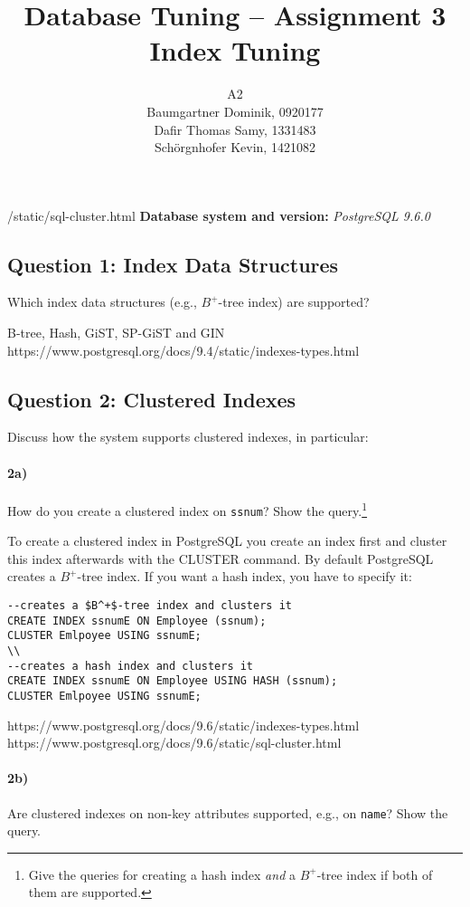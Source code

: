 \documentclass[11pt]{scrartcl}
\title{
  \textbf{\large Database Tuning -- Assignment 3}\\
  Index Tuning
}
\author{
 A2\\
\large Baumgartner Dominik, 0920177 \\
\large Dafir Thomas Samy, 1331483 \\
\large Sch\"orgnhofer Kevin, 1421082
}
\begin{document}
\maketitle

/static/sql-cluster.html
\noindent\textbf{Database system and version:} {\it PostgreSQL 9.6.0}

\subsection*{Question 1: Index Data Structures} Which index data structures (e.g., $B^+$-tree
index) are supported?

\smallskip

B-tree, Hash, GiST, SP-GiST and GIN\\
https://www.postgresql.org/docs/9.4/static/indexes-types.html

\subsection*{Question 2: Clustered Indexes} Discuss how the system
supports clustered indexes, in particular:

\paragraph{2a)} How do you create a clustered index on {\tt ssnum}?
Show the query.\footnote{Give the queries for creating a hash index
  \emph{and} a $B^+$-tree index if both of them are supported.}

\smallskip

To create a clustered index in PostgreSQL you create an index first and cluster this index afterwards with the CLUSTER command. By default PostgreSQL creates a $B^+$-tree index. If you want a hash index, you have to specify it:

{\small
\begin{verbatim}
--creates a $B^+$-tree index and clusters it
CREATE INDEX ssnumE ON Employee (ssnum);
CLUSTER Emlpoyee USING ssnumE;
\\
--creates a hash index and clusters it
CREATE INDEX ssnumE ON Employee USING HASH (ssnum);
CLUSTER Emlpoyee USING ssnumE;
\end{verbatim}
}

https://www.postgresql.org/docs/9.6/static/indexes-types.html
https://www.postgresql.org/docs/9.6/static/sql-cluster.html

\paragraph{2b)} Are clustered indexes on non-key attributes supported, e.g.,
on {\tt name}?  Show the query.
\end{document}
